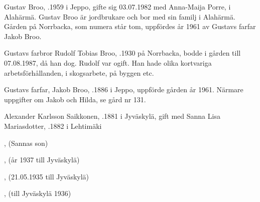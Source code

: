 


Gustav Broo,  .1959 i Jeppo, gifte sig 03.07.1982 med Anna-Maija Porre,  i Alahärmä. Gustav Broo är jordbrukare och bor med sin familj i Alahärmä. Gården på Norrbacka, som numera står tom, uppfördes år 1961 av Gustavs farfar Jakob Broo.
\begin{jhchildren}
  \item {}
  \item {}
  \item {}
  \item {}
\end{jhchildren}


Gustavs farbror Rudolf Tobias Broo, .1930 på Norrbacka, bodde i gården till 07.08.1987, då han dog. Rudolf var ogift. Han hade olika kortvariga arbetsförhållanden, i skogsarbete, på byggen etc.


Gustavs farfar, Jakob Broo, .1886 i Jeppo, uppförde gården år 1961. Närmare uppgifter om Jakob och Hilda, se gård nr 131.




Alexander Karlsson Saikkonen, .1881 i Jyväskylä, gift med Sanna Lisa Mariasdotter, .1882 i Lehtimäki
\begin{jhchildren}
  \item {}, (Sannas son)
  \item {}
  \item {}, (år 1937 till Jyväskylä)
  \item {}
  \item {}
  \item {}, (21.05.1935 till Jyväskylä)
  \item {}, (till Jyväskylä 1936)
\end{jhchildren}

